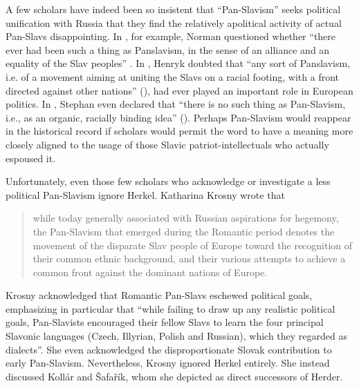 A few scholars have indeed been so insistent that “Pan-Slavism” seeks political unification with Russia that they find the relatively apolitical activity of actual Pan-Slavs disappointing. In \citeyear{jopson_introduction_1934}, for example, Norman \citeauthor{jopson_introduction_1934} questioned whether “there ever had been such a thing as Panslavism, in the sense of an alliance and an equality of the Slav peoples” \citep[210]{jopson_introduction_1934}. In \citeyear{batowski_poles_1948}, Henryk \citeauthor{batowski_poles_1948} doubted that “any sort of Panslavism, i.e. of a movement aiming at uniting the Slavs on a racial footing, with a front directed against other nations” (\citeyear[407]{batowski_poles_1948}), had ever played an important role in European politics. In \citeyear{horak_heritage_1963}, Stephan \citeauthor{horak_heritage_1963} even declared that “there is no such thing as Pan-Slavism, i.e., as an organic, racially binding idea” (\citeyear[140]{horak_heritage_1963}). Perhaps Pan-Slavism would reappear in the historical record if scholars would permit the word to have a meaning more closely aligned to the usage of those Slavic patriot-intellectuals who actually espoused it.

Unfortunately, even those few scholars who acknowledge or investigate a less political Pan-Slavism ignore Herkel. Katharina Krosny wrote that

\begin{quote}
    while today generally associated with Russian aspirations for hegemony, the Pan-Slavism that emerged during the Romantic period denotes the \linebreak{}movement of the disparate Slav people of Europe toward the recognition of their common ethnic background, and their various attempts to achieve a common front against the dominant nations of Europe. \citep[849]{krosny_panslavism_2004}
\end{quote}

\noindent {}Krosny acknowledged that Romantic Pan-Slavs eschewed political goals, emphasizing in particular that “while failing to draw up any realistic political goals, Pan-Slavists encouraged their fellow Slavs to learn the four principal Slavonic languages (Czech,  Illyrian, Polish and Russian), which they regarded as dialects”. She even acknowledged the disproportionate Slovak contribution to early Pan-Slavism. Nevertheless, Krosny ignored Herkel entirely. She instead discussed Kollár and Šafařík, whom she depicted as direct successors of Herder.

